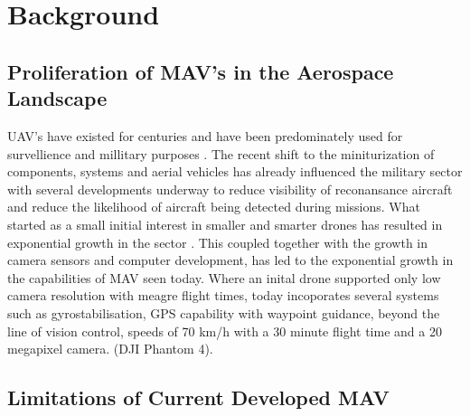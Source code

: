 \section{Background}

\subsection{Proliferation of MAV's in the Aerospace Landscape}
\label{subsec:ProliferationMAVs}

UAV's have existed for centuries and have been predominately used for survellience and millitary purposes . The recent shift to the miniturization of components, systems and aerial vehicles has already influenced the military sector with several developments underway to reduce visibility of reconansance aircraft and reduce the likelihood of aircraft being detected during missions. What started as a small initial interest in smaller and smarter drones has resulted in exponential growth in the sector . This coupled together with the growth in camera sensors and computer development, has led to the exponential growth in the capabilities of MAV seen today. Where an inital drone supported only low camera resolution with meagre flight times, today incoporates several systems such as gyrostabilisation, GPS capability with waypoint guidance, beyond the line of vision control, speeds of 70 km/h with a 30 minute flight time and a 20 megapixel camera. (DJI Phantom 4). \\


\subsection{Limitations of Current Developed MAV}
\label{subsec:Limitations}

